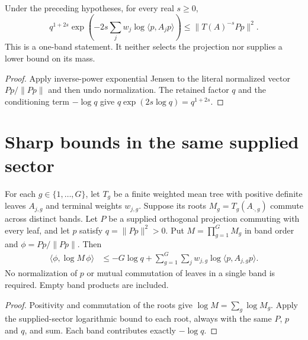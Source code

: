\begin{theorem}
    \label{thm:mean_tree_projection_inverse_norm_upper_consumer}
    \leanok
    Under the preceding hypotheses, for every real $s\geq0$,
    \[
        q^{1+2s}\exp\left(-2s\sum_jw_j
            \log\langle p,A_jp\rangle\right)
        \leq\|T(A)^{-s}Pp\|^2.
    \]
    This is a one-band statement. It neither selects the projection
    nor supplies a lower bound on its mass.
\end{theorem}
\begin{proof}
    \leanok
    Apply inverse-power exponential Jensen to the literal normalized
    vector $Pp/\|Pp\|$ and then undo normalization. The retained factor
    $q$ and the conditioning term $-\log q$ give
    $q\exp(2s\log q)=q^{1+2s}$.
\end{proof}

\section{Sharp bounds in the same supplied sector}
\label{sec:selected_bell_post_sharp_tree}


\begin{theorem}
    \label{thm:mean_tree_projection_multiband_log_upper}
    \leanok
    For each $g\in\{1,\ldots,G\}$, let $T_g$ be a finite weighted mean
    tree with positive definite leaves $A_{j,g}$ and terminal weights
    $w_{j,g}$. Suppose its roots $M_g=T_g(A_{\cdot,g})$ commute across
    distinct bands. Let $P$ be a supplied orthogonal projection commuting
    with every leaf, and let $p$ satisfy $q=\|Pp\|^2>0$.
    Put $M=\prod_{g=1}^G M_g$ in band order and $\phi=Pp/\|Pp\|$.
    Then
    \begin{align}
        \langle\phi,\log M\,\phi\rangle
        &\leq-G\log q+
            \sum_{g=1}^G\sum_jw_{j,g}\log\langle p,A_{j,g}p\rangle.
    \end{align}
    No normalization of $p$ or mutual commutation of leaves in a single
    band is required. Empty band products are included.
\end{theorem}
\begin{proof}
    \leanok
    Positivity and commutation of the roots give
    $\log M=\sum_g\log M_g$. Apply the supplied-sector logarithmic
    bound to each root, always with the same $P$, $p$ and $q$, and sum.
    Each band contributes exactly $-\log q$.
\end{proof}

